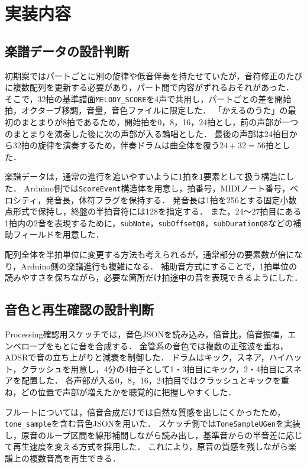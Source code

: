 \documentclass[uplatex,dvipdfmx]{jlreq}
\begin{document}
\section{実装内容}
\subsection{楽譜データの設計判断}
初期案ではパートごとに別の旋律や低音伴奏を持たせていたが，音符修正のたびに複数配列を更新する必要があり，パート間で内容がずれるおそれがあった．
そこで，32拍の基準譜面\texttt{MELODY\_SCORE}を4声で共用し，パートごとの差を開始拍，オクターブ移調，音量，音色ファイルに限定した．
「かえるのうた」の最初のまとまりが8拍であるため，開始拍を0，8，16，24拍とし，前の声部が一つのまとまりを演奏した後に次の声部が入る輪唱とした．
最後の声部は24拍目から32拍の旋律を演奏するため，伴奏ドラムは曲全体を覆う$24+32=56$拍とした．

楽譜データは，通常の進行を追いやすいように1拍を1要素として扱う構造にした．
Arduino側では\texttt{ScoreEvent}構造体を用意し，拍番号，MIDIノート番号，ベロシティ，発音長，休符フラグを保持する．
発音長は1拍を256とする固定小数点形式で保持し，終盤の半拍音符には128を指定する．
また，24〜27拍目にある1拍内の2音を表現するために，\texttt{subNote}，\texttt{subOffsetQ8}，\texttt{subDurationQ8}などの補助フィールドを用意した．

配列全体を半拍単位に変更する方法も考えられるが，通常部分の要素数が倍になり，Arduino側の楽譜進行も複雑になる．
補助音方式にすることで，1拍単位の読みやすさを保ちながら，必要な箇所だけ拍途中の音を表現できるようにした．

\subsection{音色と再生確認の設計判断}
Processing確認用スケッチでは，音色JSONを読み込み，倍音比，倍音振幅，エンベロープをもとに音を合成する．
金管系の音色では複数の正弦波を重ね，ADSRで音の立ち上がりと減衰を制御した．
ドラムはキック，スネア，ハイハット，クラッシュを用意し，4分の4拍子として1・3拍目にキック，2・4拍目にスネアを配置した．
各声部が入る0，8，16，24拍目ではクラッシュとキックを重ね，どの位置で声部が増えたかを聴覚的に把握しやすくした．

フルートについては，倍音合成だけでは自然な質感を出しにくかったため，\texttt{tone\_sample}を含む音色JSONを用いた．
スケッチ側では\texttt{ToneSampleUGen}を実装し，原音のループ区間を線形補間しながら読み出し，基準音からの半音差に応じて再生速度を変える方式を採用した．
これにより，原音の質感を残しながら楽譜上の複数音高を再生できる．
\end{document}
